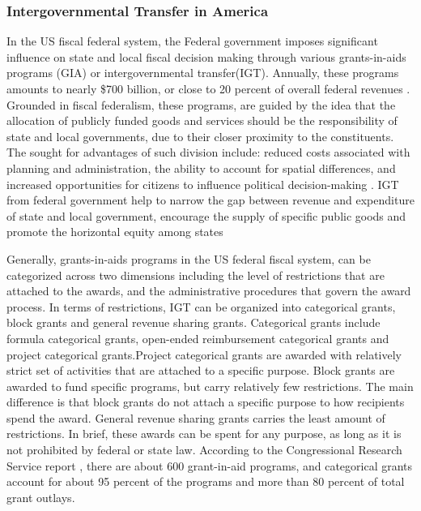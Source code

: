 \subsubsection{Intergovernmental Transfer in America}
In the US fiscal federal system, the Federal government imposes significant influence on state and local fiscal decision making through various grants-in-aids programs (GIA) or intergovernmental transfer(IGT). Annually, these programs amounts to nearly \$700 billion, or close to 20 percent of overall federal revenues \cite{dilger2015federal}. Grounded in fiscal federalism, these programs, are guided by the idea that the allocation of publicly funded goods and services should be the responsibility of state and local governments, due to their closer proximity to the constituents. The sought for advantages of such division include: reduced costs associated with planning and administration, the ability to account for spatial differences, and increased opportunities for citizens to influence political decision-making \cite{musgrave1997devolution}. IGT from federal government help to narrow the gap between revenue and expenditure of state and local government, encourage the supply of specific public goods and promote the horizontal equity among states

Generally, grants-in-aids programs in the US federal fiscal system, can be categorized across two dimensions including the level of restrictions that are attached to the awards, and the administrative procedures that govern the award process. In terms of restrictions, IGT can be organized into categorical grants, block grants and general revenue sharing grants. Categorical grants include formula categorical grants, open-ended reimbursement categorical grants and project categorical grants.Project categorical grants are awarded with relatively strict set of activities that are attached to a specific purpose. Block grants are awarded to fund specific programs, but carry relatively few restrictions. The main difference is that block grants do not attach a specific purpose to how recipients spend the award. General revenue sharing grants carries the least amount of restrictions. In brief, these awards can be spent for any purpose, as long as it is not prohibited by federal or state law.  According to the Congressional Research Service report \cite{dilger2015federal}, there are about 600 grant-in-aid programs, and categorical grants account for about 95 percent of the programs and more than 80 percent of total grant outlays.

